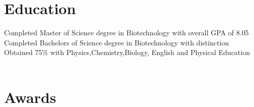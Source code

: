 \documentclass[letterpaper]{twentysecondcv} %
\begin{document}

\section{Education}

\begin{twenty} %
	{Completed Master of Science degree in Biotechnology with overall GPA of 8.05 }
	{Completed Bachelors of Science degree in Biotechnology with distinction}
	{Obtained 75\% with Physics,Chemistry,Biology, English and Physical Education\\\\ }
\end{twenty}

\iffalse
\section{Publications}

\begin{twentyshort} %
	\twentyitemshort{1865}{Chapter One, Down the Rabbit Hole.}
	\twentyitemshort{1865}{Chapter Two, The Pool of Tears.}
	\twentyitemshort{1865}{Chapter Three,  The Caucus Race and a Long Tale.}
	\twentyitemshort{1865}{Chapter Four,  The Rabbit Sends a Little Bill.}
	\twentyitemshort{1865}{Chapter Five,  Advice from a Caterpillar.}
\end{twentyshort}
\fi

\iffalse
\section{Awards}
\end{document}
